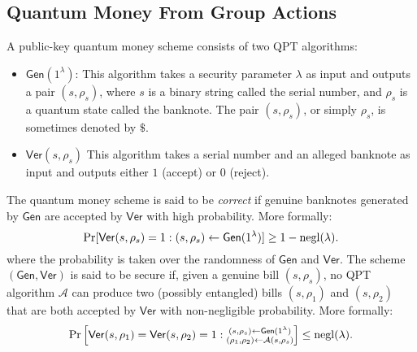 \documentclass[11pt]{article}
\theoremstyle{definition}
\newcommand{\gen}{\mathsf{Gen}}
\newcommand{\ver}{\mathsf{Ver}}
\begin{document}
\subsection{Quantum Money From Group Actions}
A public-key quantum money scheme consists of two QPT algorithms: 
\begin{itemize}
\item $\gen(1^\lambda)$: This algorithm takes a security parameter $\lambda$ as input and outputs a pair $(s, \rho_s)$, where $s$ is a binary string called the serial number, and $\rho_s$ is a quantum state called the banknote. The pair $(s, \rho_s)$, or simply $\rho_s$, is sometimes denoted by $\$$.
\item $\ver(s, \rho_s)$ This algorithm takes a serial number and an alleged banknote as input and outputs either $1$ (accept) or $0$ (reject).
\end{itemize}

The quantum money scheme is said to be \textit{correct} if genuine banknotes generated by $\gen$ are accepted by $\ver$ with high probability. More formally:
\[ \Pr[\ver(s, \rho_s) = 1 : (s, \rho_s) \gets \gen(1^\lambda)] \ge 1 - \negl(\lambda). \]
where the probability is taken over the randomness of $\gen$ and $\ver$. The scheme $(\gen, \ver)$ is said to be secure if, given a genuine bill $(s, \rho_s)$, no QPT algorithm $\mathcal{A}$ can produce two (possibly entangled) bills $(s, \rho_1)$ and $(s, \rho_2)$ that are both accepted by $\ver$ with non-negligible probability. More formally:
\[ \Pr\left[ \ver(s, \rho_1) = \ver(s, \rho_2) = 1 : \substack{(s, \rho_s) \gets \gen(1^\lambda) \\ (\rho_1, \rho_2) \gets \mathcal{A}(s, \rho_s)} \right] \le \negl(\lambda). \]
\end{document}
